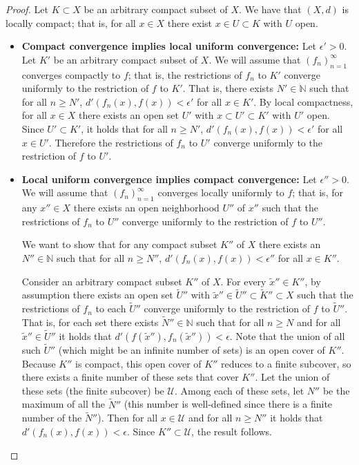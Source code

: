 \begin{proof}

Let \(K \subset X\) be an arbitrary compact subset of \(X\). We have that \((X, d)\) is locally compact; that is, for all \(x \in X\) there exist \(x \in U \subset K\) with \(U\) open.



\begin{itemize}

\item \textbf{Compact convergence implies local uniform convergence:} Let \(\epsilon' > 0\). Let \(K'\) be an arbitrary compact subset of \(X\). We will assume that \((f_n)_{n=1}^\infty\) converges compactly to \(f\); that is, the restrictions of \(f_n\) to \(K'\) converge uniformly to the restriction of \(f\) to \(K'\). That is, there exists \(N' \in \mathbb{N}\) such that for all \( n \geq N'\), \(d'(f_n(x), f(x)) < \epsilon'\) for all \(x \in K'\). By local compactness, for all \(x \in X\) there exists an open set \(U'\) with \(x \subset U' \subset K'\) with \(U'\) open. Since \(U' \subset K'\), it holds that  for all \( n \geq N'\), \(d'(f_n(x), f(x)) < \epsilon'\) for all \(x \in U'\). Therefore the restrictions of \(f_n\) to \(U'\) converge uniformly to the restriction of \(f\) to \(U'\).

\item \textbf{Local uniform convergence implies compact convergence:} Let \(\epsilon'' > 0\). We will assume that \((f_n)_{n=1}^\infty\) converges locally uniformly to \(f\); that is, for any \(x'' \in X\) there exists an open neighborhood \(U''\) of \(x''\) such that the restrictions of \(f_n\) to \(U''\) converge uniformly to the restriction of \(f\) to \(U''\).

We want to show that for any compact subset \(K''\) of \(X\) there exists an \(N'' \in \mathbb{N}\) such that for all \( n \geq N''\), \(d'(f_n(x), f(x)) < \epsilon''\) for all \(x \in K''\).

Consider an arbitrary compact subset \(K''\) of \(X\). For every \(\tilde{x}'' \in K''\), by assumption there exists an open set \(\tilde{U}''\) with \( \tilde{x}'' \in \tilde{U}'' \subset \tilde{K}'' \subset X\) such that the restrictions of \(f_n\) to each \(\tilde{U}''\) converge uniformly to the restriction of \(f\) to \(\tilde{U}''\). That is, for each set there exists \(\tilde{N}'' \in \mathbb{N}\) such that for all \(n \geq N\) and for all \(\tilde{x}'' \in \tilde{U}''\) it holds that \(d'(f(\tilde{x}''), f_n(\tilde{x}'')) < \epsilon\). Note that the union of all such \(\tilde{U}''\) (which might be an infinite number of sets) is an open cover of \(K''\). Because \(K''\) is compact, this open cover of \(K''\) reduces to a finite subcover, so there exists a finite number of these sets that cover \(K''\). Let the union of these sets (the finite subcover) be \(\mathcal{U}\). Among each of these sets, let \(N''\) be the maximum of all the \(\tilde{N}''\) (this number is well-defined since there is a finite number of the \(\tilde{N}''\)). Then for all \(x \in \mathcal{U}\) and for all \(n \geq N''\) it holds that \(d'(f_n(x), f(x)) < \epsilon\). Since \(K'' \subset \mathcal{U}\), the result follows.  


\end{itemize}
\end{proof}
